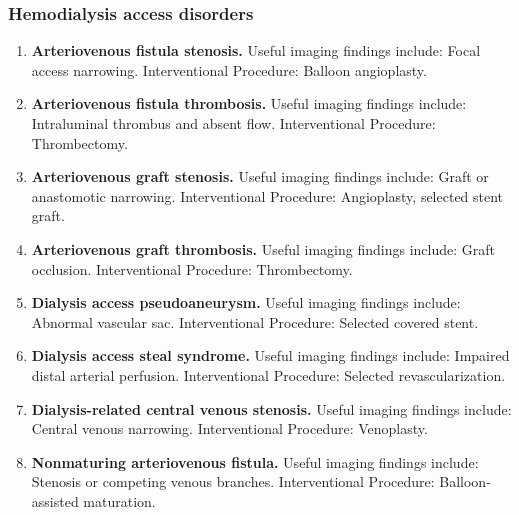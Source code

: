 \subsubsection{Hemodialysis access disorders}
\begin{enumerate}[leftmargin=*,itemsep=0.45em,topsep=0.4em]
\item \textbf{Arteriovenous fistula stenosis.} Useful imaging findings include: Focal access narrowing. Interventional Procedure: Balloon angioplasty.
\item \textbf{Arteriovenous fistula thrombosis.} Useful imaging findings include: Intraluminal thrombus and absent flow. Interventional Procedure: Thrombectomy.
\item \textbf{Arteriovenous graft stenosis.} Useful imaging findings include: Graft or anastomotic narrowing. Interventional Procedure: Angioplasty, selected stent graft.
\item \textbf{Arteriovenous graft thrombosis.} Useful imaging findings include: Graft occlusion. Interventional Procedure: Thrombectomy.
\item \textbf{Dialysis access pseudoaneurysm.} Useful imaging findings include: Abnormal vascular sac. Interventional Procedure: Selected covered stent.
\item \textbf{Dialysis access steal syndrome.} Useful imaging findings include: Impaired distal arterial perfusion. Interventional Procedure: Selected revascularization.
\item \textbf{Dialysis-related central venous stenosis.} Useful imaging findings include: Central venous narrowing. Interventional Procedure: Venoplasty.
\item \textbf{Nonmaturing arteriovenous fistula.} Useful imaging findings include: Stenosis or competing venous branches. Interventional Procedure: Balloon-assisted maturation.
\end{enumerate}

